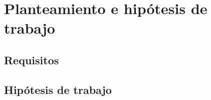 \chapter{Planteamiento e hipótesis de trabajo}
\label{cap:planEHipotesis}

\section{Requisitos}

\section{Hipótesis de trabajo}


